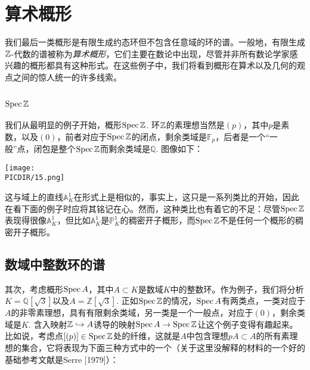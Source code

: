 \section{算术概形}

我们最后一类概形是有限生成约态环但不包含任意域的环的谱。一般地，有限生成$\mathbb{Z}$\hyp 代数的谱被称为\textit{算术概形}，它们主要在数论中出现，尽管并非所有数论学家感兴趣的概形都具有这种形式。在这些例子中，我们将看到概形在算术以及几何的观点之间的惊人统一的许多线索。\nottran

\subsection{\texorpdfstring{$\operatorname{Spec} \mathbb{Z}$}{Spec Z}}

我们从最明显的例子开始，概形$\operatorname{Spec} \mathbb{Z}$. 环$\mathbb{Z}$的素理想当然是$(p)$，其中$p$是素数，以及$(0)$，前者对应于$\operatorname{Spec} \mathbb{Z}$的闭点，剩余类域是$\mathbb{F}_p$，后者是一个“一般”点，闭包是整个$\operatorname{Spec} \mathbb{Z}$而剩余类域是$\mathbb{Q}$. 图像如下：

\begin{center}\texttt{[image: \\PICDIR/15.png]}\end{center}

\noindent 这与域上的直线$\mathbb{A}_K^1$在形式上是相似的，事实上，这只是一系列类比的开始，因此在看下面的例子时应将其铭记在心。然而，这种类比也有着它的不足：尽管$\operatorname{Spec} \mathbb{Z}$表现得很像$\mathbb{A}_K^1$，但比如$\mathbb{A}_K^1$是$\mathbb{P}_K^1$的稠密开子概形，而$\operatorname{Spec} \mathbb{Z}$不是任何一个概形的稠密开子概形。

\subsection{数域中整数环的谱}

其次，考虑概形$\operatorname{Spec} A$，其中$A\subset K$是数域$K$中的整数环。作为例子，我们将分析$K=\mathbb{Q}[\sqrt{3}]$以及$A=\mathbb{Z}[\sqrt{3}]$. 正如$\operatorname{Spec} \mathbb{Z}$的情况，$\operatorname{Spec} A$有两类点，一类对应于$A$的非零素理想，具有有限剩余类域，另一类是一个一般点，对应于$(0)$，剩余类域是$K$. 含入映射$\mathbb{Z}\hookrightarrow A$诱导的映射$\operatorname{Spec} A\to \operatorname{Spec} \mathbb{Z}$让这个例子变得有趣起来。比如说，考虑点$[(p)]\in \operatorname{Spec} \mathbb{Z}$处的纤维，这就是$A$中包含理想$pA\subset A$的所有素理想的集合，它将表现为下面三种方式中的一个（关于这里没解释的材料的一个好的基础参考文献是Serre [1979]）：

